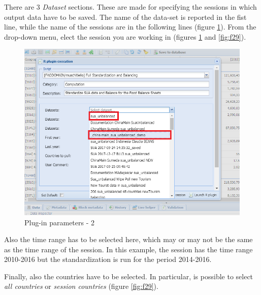 \documentclass[]{article}
\begin{document}
There are 3 \emph{Dataset} sections. These are made for specifying the
sessions in which output data have to be saved. The name of the data-set
is reported in the fist line, while the name of the sessions are in the
following lines (figure \ref{fig:f28}). From the drop-down menu, elect
the session you are working in (figures \ref{fig:f28} and
\ref{fig:f29}).

\begin{figure}[H]

{\centering \includegraphics[width=1\linewidth]{images/standPlugin/27_parametersPI2} 

}

\caption{\label{fig:f28}Plug-in parameters - 2}\label{fig:f28}
\end{figure}

Also the time range has to be selected here, which may or may not be the
same as the time range of the session. In this example, the session has
the time range 2010-2016 but the standardization is run for the period
2014-2016.

Finally, also the countries have to be selected. In particular, is
possible to select \emph{all countries} or \emph{session countries}
(figure \ref{fig:f29}).
\end{document}
